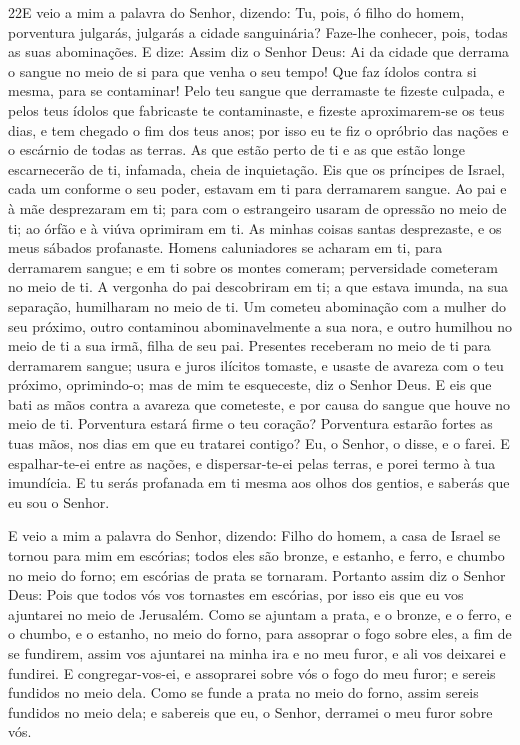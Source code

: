 \lettrine{22} E veio a mim a palavra do Senhor, dizendo:
Tu, pois, ó filho do homem, porventura julgarás, julgarás a
cidade sanguinária? Faze-lhe conhecer, pois, todas as suas
abominações. E dize: Assim diz o Senhor Deus: Ai da cidade que
derrama o sangue no meio de si para que venha o seu tempo! Que faz
ídolos contra si mesma, para se contaminar! Pelo teu sangue que
derramaste te fizeste culpada, e pelos teus ídolos que fabricaste te
contaminaste, e fizeste aproximarem-se os teus dias, e tem chegado o
fim dos teus anos; por isso eu te fiz o opróbrio das nações e o
escárnio de todas as terras. As que estão perto de ti e as que
estão longe escarnecerão de ti, infamada, cheia de inquietação.
Eis que os príncipes de Israel, cada um conforme o seu poder,
estavam em ti para derramarem sangue. Ao pai e à mãe desprezaram
em ti; para com o estrangeiro usaram de opressão no meio de ti; ao
órfão e à viúva oprimiram em ti. As minhas coisas santas
desprezaste, e os meus sábados profanaste. Homens caluniadores
se acharam em ti, para derramarem sangue; e em ti sobre os montes
comeram; perversidade cometeram no meio de ti. A vergonha do
pai descobriram em ti; a que estava imunda, na sua separação,
humilharam no meio de ti. Um cometeu abominação com a mulher
do seu próximo, outro contaminou abominavelmente a sua nora, e outro
humilhou no meio de ti a sua irmã, filha de seu pai.
Presentes receberam no meio de ti para derramarem sangue;
usura e juros ilícitos tomaste, e usaste de avareza com o teu
próximo, oprimindo-o; mas de mim te esqueceste, diz o Senhor Deus.
E eis que bati as mãos contra a avareza que cometeste, e por
causa do sangue que houve no meio de ti. Porventura estará
firme o teu coração? Porventura estarão fortes as tuas mãos, nos
dias em que eu tratarei contigo? Eu, o Senhor, o disse, e o farei.
E espalhar-te-ei entre as nações, e dispersar-te-ei pelas
terras, e porei termo à tua imundícia. E tu serás profanada
em ti mesma aos olhos dos gentios, e saberás que eu sou o Senhor.

E veio a mim a palavra do Senhor, dizendo: Filho do homem,
a casa de Israel se tornou para mim em escórias; todos eles são
bronze, e estanho, e ferro, e chumbo no meio do forno; em escórias
de prata se tornaram. Portanto assim diz o Senhor Deus: Pois
que todos vós vos tornastes em escórias, por isso eis que eu vos
ajuntarei no meio de Jerusalém. Como se ajuntam a prata, e o
bronze, e o ferro, e o chumbo, e o estanho, no meio do forno, para
assoprar o fogo sobre eles, a fim de se fundirem, assim vos
ajuntarei na minha ira e no meu furor, e ali vos deixarei e
fundirei. E congregar-vos-ei, e assoprarei sobre vós o fogo
do meu furor; e sereis fundidos no meio dela. Como se funde a
prata no meio do forno, assim sereis fundidos no meio dela; e
sabereis que eu, o Senhor, derramei o meu furor sobre vós.

